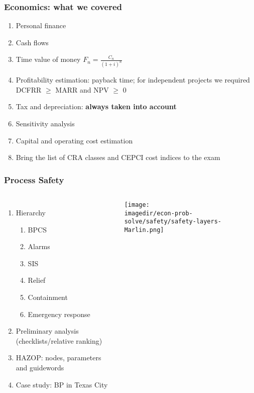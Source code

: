 \begin{frame}\frametitle{Economics: what we covered}
	\begin{enumerate}
		\item	Personal finance
		\item	Cash flows
		\item	Time value of money $\displaystyle F_n = \frac{C_n}{(1+i)^n}$
		\item	Profitability estimation: payback time; for independent projects we required DCFRR $\geq$ MARR and NPV $\geq$ 0
		\item	Tax and depreciation: \textbf{always taken into account}
		\item	Sensitivity analysis
		\item	Capital and operating cost estimation
		\item	{\color{red} Bring the list of CRA classes and CEPCI cost indices to the exam}
	\end{enumerate}
\end{frame}

\begin{frame}\frametitle{Process Safety}
	\begin{columns}[t]
			\begin{enumerate}
				\item	Hierarchy
				\begin{enumerate}
					\item	BPCS
					\item	Alarms
					\item	SIS
					\item	Relief
					\item	Containment
					\item	Emergency response
				\end{enumerate}
				\item	Preliminary analysis (checklists/relative ranking)
				\item	HAZOP: nodes, parameters and guidewords
				\item	Case study: BP in Texas City
			\end{enumerate}
			\vspace{-20pt}
			\begin{center}
				\texttt{[image: \\imagedir/econ-prob-solve/safety/safety-layers-Marlin.png]}
			\end{center}
	\end{columns}	
\end{frame}

